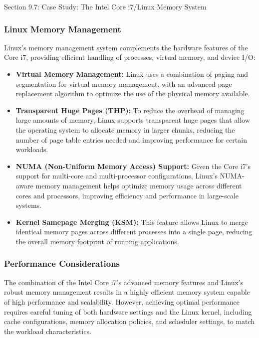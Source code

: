 \begin{notes}{Section 9.7: Case Study: The Intel Core i7/Linux Memory System}
    \subsubsection*{Linux Memory Management}
    
    Linux's memory management system complements the hardware features of the Core i7, providing efficient handling of processes, virtual memory, and device I/O:
    
    \begin{itemize}
        \item \textbf{Virtual Memory Management:} Linux uses a combination of paging and segmentation for virtual memory management, with an advanced page replacement algorithm to optimize the use of 
        the physical memory available.
        \item \textbf{Transparent Huge Pages (THP):} To reduce the overhead of managing large amounts of memory, Linux supports transparent huge pages that allow the operating system to allocate memory 
        in larger chunks, reducing the number of page table entries needed and improving performance for certain workloads.
        \item \textbf{NUMA (Non-Uniform Memory Access) Support:} Given the Core i7's support for multi-core and multi-processor configurations, Linux's NUMA-aware memory management helps optimize 
        memory usage across different cores and processors, improving efficiency and performance in large-scale systems.
        \item \textbf{Kernel Samepage Merging (KSM):} This feature allows Linux to merge identical memory pages across different processes into a single page, reducing the overall memory footprint 
        of running applications.
    \end{itemize}
    
    \subsubsection*{Performance Considerations}
    
    The combination of the Intel Core i7's advanced memory features and Linux's robust memory management results in a highly efficient memory system capable of high performance and scalability. 
    However, achieving optimal performance requires careful tuning of both hardware settings and the Linux kernel, including cache configurations, memory allocation policies, and scheduler settings, 
    to match the workload characteristics.
\end{notes}
